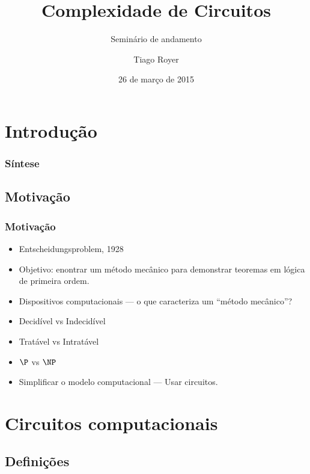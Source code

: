 \documentclass[utf8,notheorems]{beamer}
\theoremstyle{definition}
\begin{document}
\author{Tiago Royer}
\title{Complexidade de Circuitos}
\subtitle{Seminário de andamento}
\date{26 de março de 2015}
\begin{frame}
    \titlepage
\end{frame}

\section{Introdução}

\begin{frame}
    \frametitle{Síntese}
    \tableofcontents
\end{frame}

\subsection{Motivação}

\begin{frame}
    \frametitle{Motivação}
    \begin{itemize}
        \item Entscheidungsproblem, 1928
        \item Objetivo: enontrar um método mecânico
            para demonstrar teoremas em lógica de primeira ordem.
        \pause
        \item Dispositivos computacionais
            --- o que caracteriza um ``método mecânico''?
        \pause
        \item Decidível vs Indecidível
        \pause
        \item Tratável vs Intratável
        \pause
        \item $\P$ vs $\NP$
        \pause
        \item Simplificar o modelo computacional
            --- Usar circuitos.
    \end{itemize}
\end{frame}

\section{Circuitos computacionais}

\subsection{Definições}

\newcommand{\placenode}[1]{
    \node (x#1) at (2*#1, 0) {$x_#1$};
    \path (2*#1+0.5, 1) node[draw,circle] (neg#1) {$\neg$};
    \coordinate (p#1) at (2*#1 - 0.5, 2);
    \coordinate (n#1) at (2*#1 + 0.5, 2);
    \draw (x#1) -- (2*#1 - 0.5, 1) -- (p#1) -- (wp);
    \draw (x#1) -- (neg#1) -- (n#1) -- (wn);
}
\end{document}
